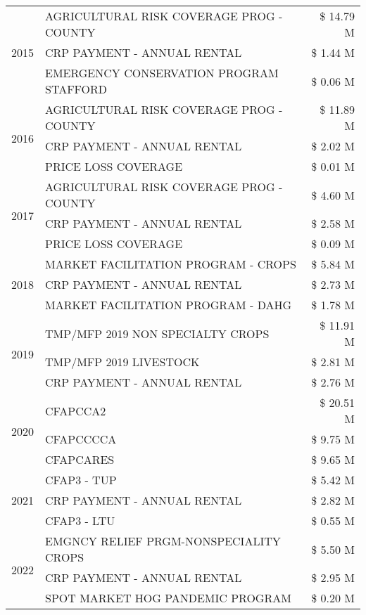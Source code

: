 \begin{tabular}{llr}
\cline{1-3}
\multirow[t]{3}{*}{2015} & AGRICULTURAL RISK COVERAGE PROG - COUNTY & \$ 14.79 M \\
 & CRP PAYMENT - ANNUAL RENTAL & \$ 1.44 M \\
 & EMERGENCY CONSERVATION PROGRAM STAFFORD & \$ 0.06 M \\
\cline{1-3}
\multirow[t]{3}{*}{2016} & AGRICULTURAL RISK COVERAGE PROG - COUNTY & \$ 11.89 M \\
 & CRP PAYMENT - ANNUAL RENTAL & \$ 2.02 M \\
 & PRICE LOSS COVERAGE & \$ 0.01 M \\
\cline{1-3}
\multirow[t]{3}{*}{2017} & AGRICULTURAL RISK COVERAGE PROG - COUNTY & \$ 4.60 M \\
 & CRP PAYMENT - ANNUAL RENTAL & \$ 2.58 M \\
 & PRICE LOSS COVERAGE & \$ 0.09 M \\
\cline{1-3}
\multirow[t]{3}{*}{2018} & MARKET FACILITATION PROGRAM - CROPS & \$ 5.84 M \\
 & CRP PAYMENT - ANNUAL RENTAL & \$ 2.73 M \\
 & MARKET FACILITATION PROGRAM - DAHG & \$ 1.78 M \\
\cline{1-3}
\multirow[t]{3}{*}{2019} & TMP/MFP 2019 NON SPECIALTY CROPS & \$ 11.91 M \\
 & TMP/MFP 2019 LIVESTOCK & \$ 2.81 M \\
 & CRP PAYMENT - ANNUAL RENTAL & \$ 2.76 M \\
\cline{1-3}
\multirow[t]{3}{*}{2020} & CFAPCCA2 & \$ 20.51 M \\
 & CFAPCCCCA & \$ 9.75 M \\
 & CFAPCARES & \$ 9.65 M \\
\cline{1-3}
\multirow[t]{3}{*}{2021} & CFAP3 - TUP & \$ 5.42 M \\
 & CRP PAYMENT - ANNUAL RENTAL & \$ 2.82 M \\
 & CFAP3 - LTU & \$ 0.55 M \\
\cline{1-3}
\multirow[t]{3}{*}{2022} & EMGNCY RELIEF PRGM-NONSPECIALITY CROPS & \$ 5.50 M \\
 & CRP PAYMENT - ANNUAL RENTAL & \$ 2.95 M \\
 & SPOT MARKET HOG PANDEMIC PROGRAM & \$ 0.20 M \\
\cline{1-3}
\bottomrule
\end{tabular}
